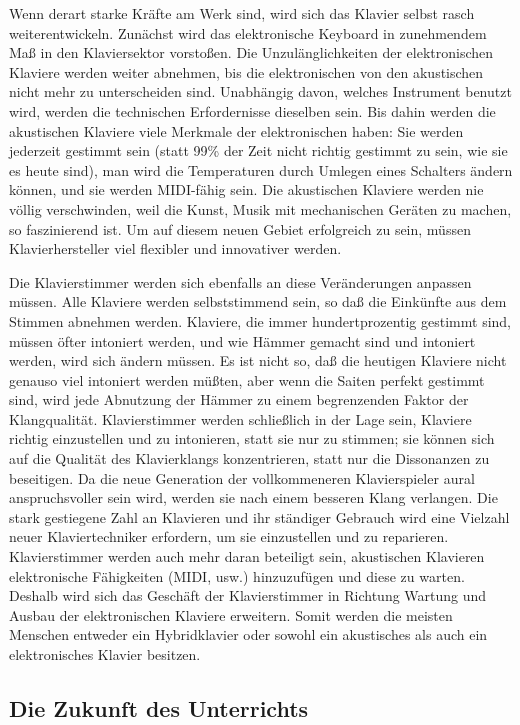 Wenn derart starke Kräfte am Werk sind, wird sich das Klavier selbst rasch weiterentwickeln.
Zunächst wird das elektronische Keyboard in zunehmendem Maß in den Klaviersektor vorstoßen.
Die Unzulänglichkeiten der elektronischen Klaviere werden weiter abnehmen, bis die elektronischen von den akustischen nicht mehr zu unterscheiden sind.
Unabhängig davon, welches Instrument benutzt wird, werden die technischen Erfordernisse dieselben sein.
Bis dahin werden die akustischen Klaviere viele Merkmale der elektronischen haben: Sie werden jederzeit gestimmt sein (statt 99\% der Zeit nicht richtig gestimmt zu sein, wie sie es heute sind), man wird die Temperaturen durch Umlegen eines Schalters ändern können, und sie werden MIDI-fähig sein.
Die akustischen Klaviere werden nie völlig verschwinden, weil die Kunst, Musik mit mechanischen Geräten zu machen, so faszinierend ist.
Um auf diesem neuen Gebiet erfolgreich zu sein, müssen Klavierhersteller viel flexibler und innovativer werden.

Die Klavierstimmer werden sich ebenfalls an diese Veränderungen anpassen müssen.
Alle Klaviere werden selbststimmend sein, so daß die Einkünfte aus dem Stimmen abnehmen werden.
Klaviere, die immer hundertprozentig gestimmt sind, müssen öfter intoniert werden, und
wie Hämmer gemacht sind und intoniert werden, wird sich ändern müssen.
Es ist nicht so, daß die heutigen Klaviere nicht genauso viel intoniert werden müßten, aber wenn die Saiten perfekt gestimmt sind, wird jede Abnutzung der Hämmer zu einem begrenzenden Faktor der Klangqualität.
Klavierstimmer werden schließlich in der Lage sein, Klaviere richtig einzustellen und zu intonieren, statt sie nur zu stimmen; sie können sich auf die Qualität des Klavierklangs konzentrieren, statt nur die Dissonanzen zu beseitigen.
Da die neue Generation der vollkommeneren Klavierspieler aural anspruchsvoller sein wird, werden sie nach einem besseren Klang verlangen.
Die stark gestiegene Zahl an Klavieren und ihr ständiger Gebrauch wird eine Vielzahl neuer Klaviertechniker erfordern, um sie einzustellen und zu reparieren.
Klavierstimmer werden auch mehr daran beteiligt sein, akustischen Klavieren elektronische Fähigkeiten (MIDI, usw.) hinzuzufügen und diese zu warten.
Deshalb wird sich das Geschäft der Klavierstimmer in Richtung Wartung und Ausbau der elektronischen Klaviere erweitern.
Somit werden die meisten Menschen entweder ein Hybridklavier oder sowohl ein akustisches als auch ein elektronisches Klavier besitzen.
 

\subsection{Die Zukunft des Unterrichts}
\label{c1iv6i}

